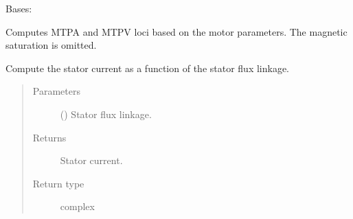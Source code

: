\documentclass[letterpaper,10pt,english]{sphinxmanual}
\begin{document}
\begin{fulllineitems}
\label{\detokenize{control.sm:control.sm.torque.TorqueCharacteristics}}
\pysigstartsignatures
{}
\pysigstopsignatures
\sphinxAtStartPar
Bases: 

\sphinxAtStartPar
Computes MTPA and MTPV loci based on the motor parameters. The magnetic
saturation is omitted.

\begin{fulllineitems}
\label{\detokenize{control.sm:control.sm.torque.TorqueCharacteristics.current}}
\pysigstartsignatures
{}
\pysigstopsignatures
\sphinxAtStartPar
Compute the stator current as a function of the stator flux linkage.
\begin{quote}\begin{description}
\item[{Parameters}] \leavevmode
\sphinxAtStartPar
{} () \textendash{} Stator flux linkage.

\item[{Returns}] \leavevmode
\sphinxAtStartPar
{} \textendash{} Stator current.

\item[{Return type}] \leavevmode
\sphinxAtStartPar
complex

\end{description}\end{quote}

\end{fulllineitems}



\end{fulllineitems}
\end{document}

